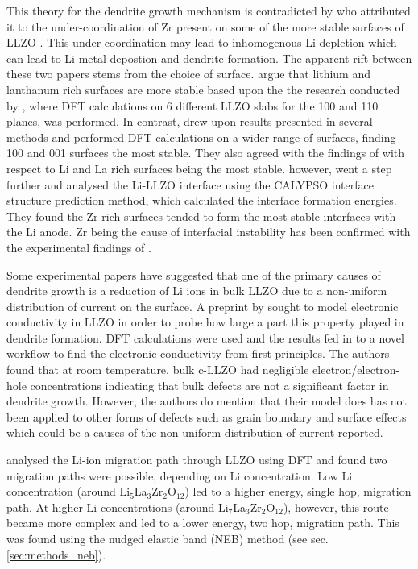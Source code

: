 \documentclass[../main.tex]{subfiles}
\begin{document}
This theory for the dendrite growth mechanism is contradicted by \citeauthor{Gao2020} who attributed it to the under-coordination of Zr present on some of the more stable surfaces of LLZO .\cite{Gao2020} This under-coordination may lead to inhomogenous Li depletion which can lead to Li metal depostion and dendrite formation.\cite{Tsai2016} The apparent rift between these two papers stems from the choice of surface. \citeauthor{Tian2018} argue that lithium and lanthanum rich surfaces are more stable based upon the the research conducted by \citeauthor{Thompson2017}, where DFT calculations on 6 different LLZO slabs for the 100 and 110 planes, was performed. In contrast, \citeauthor{Gao2020} drew upon results presented in several methods\cite{Thompson2017, Canepa2018, Yu2016a} and performed DFT calculations on a wider range of surfaces, finding 100 and 001 surfaces the most stable. They also agreed with the findings of \citeauthor{Tian2018} with respect to Li and La rich surfaces being the most stable. \citeauthor{Gao2020} however, went a step further and analysed the Li-LLZO interface using the CALYPSO interface structure prediction method\cite{Wang2012, Gao2019}, which calculated the interface formation energies. They found the Zr-rich surfaces tended to form the most stable interfaces with the Li anode. Zr being the cause of interfacial instability has been confirmed with the experimental findings of \citeauthor{Zhu2019} \cite{Zhu2019}.

Some experimental papers have suggested that one of the primary causes of dendrite growth is a reduction of Li ions in bulk LLZO due to a non-uniform distribution of current on the surface.\cite{Han2019_dendrite, Aguesse2017}
A preprint by \citeauthor{squires_2020} sought to model electronic conductivity in LLZO in order to probe how large a part this property played in dendrite formation.\cite{squires_2020} DFT calculations were used and the results fed in to a novel workflow to find the electronic conductivity from first principles. The authors found that at room temperature, bulk c-LLZO had negligible electron/electron-hole concentrations indicating that bulk defects are not a significant factor in dendrite growth. However, the authors do mention that their model does has not been applied to other forms of defects such as grain boundary and surface effects which could be a causes of the non-uniform distribution of current reported. 

\citeauthor{Xu2012} analysed the Li-ion migration path through LLZO using DFT and found two migration paths were possible, depending on Li concentration.\cite{Xu2012} Low Li concentration (around Li$_5$La$_3$Zr$_2$O$_{12}$) led to a higher energy, single hop, migration path. At higher Li concentrations (around Li$_7$La$_3$Zr$_2$O$_{12}$), however, this route became more complex and led to a lower energy, two hop, migration path. This was found using the nudged elastic band (NEB) method (see sec. \ref{sec:methods_neb}).
\end{document}

